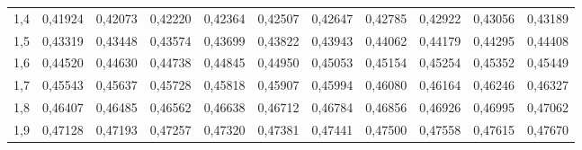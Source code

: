 \documentclass[14pt,aspectratio=1610]{beamer}
\begin{document}
\begin{frame}[fragile]{}
\begin{block}{}
\begin{center}
{\begin{tabular}{rrrrrrrrrrr}
  1,4 & 0,41924 & 0,42073 & 0,42220 & 0,42364 & 0,42507 & 0,42647 & 0,42785 & 0,42922 & 0,43056 & 0,43189 \\ 
  1,5 & 0,43319 & 0,43448 & 0,43574 & 0,43699 & 0,43822 & 0,43943 & 0,44062 & 0,44179 & 0,44295 & 0,44408 \\ 
  1,6 & 0,44520 & 0,44630 & 0,44738 & 0,44845 & 0,44950 & 0,45053 & 0,45154 & 0,45254 & 0,45352 & 0,45449 \\ 
  1,7 & 0,45543 & 0,45637 & 0,45728 & 0,45818 & 0,45907 & 0,45994 & 0,46080 & 0,46164 & 0,46246 & 0,46327 \\ 
  1,8 & 0,46407 & 0,46485 & 0,46562 & 0,46638 & 0,46712 & 0,46784 & 0,46856 & 0,46926 & 0,46995 & 0,47062 \\ 
  1,9 & 0,47128 & 0,47193 & 0,47257 & 0,47320 & 0,47381 & 0,47441 & 0,47500 & 0,47558 & 0,47615 & 0,47670 \\ 
   \hline
\end{tabular}}
\end{center}
\end{block}
\end{frame}
\end{document}
